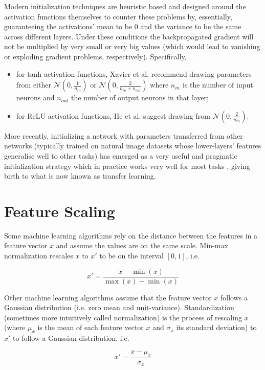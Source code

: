 Modern initialization techniques are heuristic based and designed around the activation functions themselves to counter these problems by, essentially, guaranteeing the activations' mean to be $0$ and the variance to be the same across different layers. Under these conditions the backpropagated gradient will not be multiplied by very small or very big values (which would lead to vanishing or exploding gradient problems, respectively). Specifically,

\begin{itemize}
    \item for tanh activation functions, Xavier et al. \cite{xavierinit} recommend drawing parameters from either $\mathcal{N}(0, \frac{1}{n_{in}})$ or $\mathcal{N}(0, \frac{2}{n_{in}+n_{out}})$ where $n_{in}$ is the number of input neurons and $n_{out}$ the number of output neurons in that layer;
    \item for ReLU activation functions, He et al. \cite{heinit} suggest drawing from $\mathcal{N}(0, \frac{2}{n_{in}})$.
\end{itemize}

More recently, initializing a network with parameters transferred from other networks (typically trained on natural image datasets whose lower-layers' features generalise well to other tasks) has emerged as a very useful and pragmatic initialization strategy which in practice works very well for most tasks \cite{howtransferable}, giving birth to what is now known as transfer learning.

\section{Feature Scaling}

Some machine learning algorithms rely on the distance between the features in a feature vector $x$ and assume the values are on the same scale. Min-max normalization rescales $x$ to $x'$ to be on the interval $[0, 1]$, i.e.

$$
x' = \frac{x - \min{(x)}}{\max{(x)} - \min{(x)}}
$$

Other machine learning algorithms assume that the feature vector $x$ follows a Gaussian distribution (i.e. zero mean and unit-variance). Standardization (sometimes more intuitively called normalization) is the process of rescaling $x$ (where $\mu_x$ is the mean of each feature vector $x$ and $\sigma_x$ its standard deviation) to $x'$ to follow a Gaussian distribution, i.e.

$$
x' = \frac{x - \mu_x}{\sigma_x}
$$


